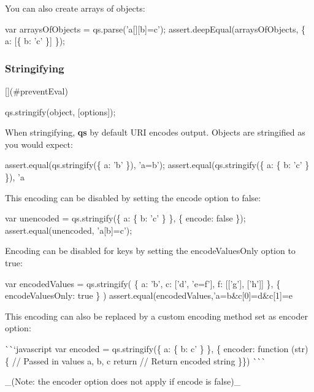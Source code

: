 You can also create arrays of objects\+:


\begin{DoxyCode}
var arraysOfObjects = qs.parse('a[][b]=c');
assert.deepEqual(arraysOfObjects, \{ a: [\{ b: 'c' \}] \});
\end{DoxyCode}


\subsubsection*{Stringifying}

\mbox{[}\mbox{]}(\#prevent\+Eval) 
\begin{DoxyCode}
qs.stringify(object, [options]);
\end{DoxyCode}


When stringifying, {\bfseries qs} by default U\+RI encodes output. Objects are stringified as you would expect\+:


\begin{DoxyCode}
assert.equal(qs.stringify(\{ a: 'b' \}), 'a=b');
assert.equal(qs.stringify(\{ a: \{ b: 'c' \} \}), 'a%
\end{DoxyCode}


This encoding can be disabled by setting the {\ttfamily encode} option to {\ttfamily false}\+:


\begin{DoxyCode}
var unencoded = qs.stringify(\{ a: \{ b: 'c' \} \}, \{ encode: false \});
assert.equal(unencoded, 'a[b]=c');
\end{DoxyCode}


Encoding can be disabled for keys by setting the {\ttfamily encode\+Values\+Only} option to {\ttfamily true}\+: 
\begin{DoxyCode}
var encodedValues  = qs.stringify(
  \{ a: 'b', c: ['d', 'e=f'], f: [['g'], ['h']] \},
  \{ encodeValuesOnly: true \}
)
assert.equal(encodedValues,'a=b&c[0]=d&c[1]=e%
\end{DoxyCode}


This encoding can also be replaced by a custom encoding method set as {\ttfamily encoder} option\+:

\`{}\`{}`javascript var encoded = qs.\+stringify(\{ a\+: \{ b\+: \textquotesingle{}c' \} \}, \{ encoder\+: function (str) \{ // Passed in values {\ttfamily a}, {\ttfamily b}, {\ttfamily c} return // Return encoded string \}\}) \`{}\`{}\`{}

\+\_\+(Note\+: the {\ttfamily encoder} option does not apply if {\ttfamily encode} is {\ttfamily false})\+\_\+

